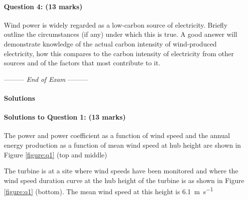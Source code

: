 \documentclass[a4paper,12pt,fleqn]{article}
\newcommand{\lastwords}{End of Exam}
\begin{document}
\paragraph{\textbf{Question 4: (13 marks)}}
Wind power is widely regarded as a low-carbon source of electricity. Briefly outline the circumstances (if any) under which this is true.
A good answer will demonstrate knowledge of the actual carbon intensity of wind-produced electricity, how this compares to the carbon intensity 
of electricity from other sources and of the factors that most contribute to it.


\begin{center}
\vspace{3cm}
--------- \textit{\lastwords} ---------
\end{center}


\label{finalpage}


\newpage
\paragraph{\textbf{Solutions} \ }
\paragraph{\textbf{Solutions to Question 1: (13 marks)}}

The power and power coefficient as a function of wind speed and the annual energy production as a function of mean wind
speed at hub height are shown in Figure \ref{figure:q1} (top and middle)

The turbine is at a site where wind speeds have been monitored and where the wind speed duration curve at the hub height of the turbine is as shown in 
Figure \ref{figure:q1} (bottom). 
The mean wind speed at this height is \SI{6.1}{\metre\per\second}
\end{document}
